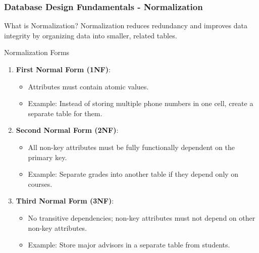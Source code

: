 \documentclass[aspectratio=169]{beamer}
\begin{document}
\begin{frame}[fragile]
    \frametitle{Database Design Fundamentals - Normalization}
    \begin{block}{What is Normalization?}
        Normalization reduces redundancy and improves data integrity by organizing data into smaller, related tables.
    \end{block}
    
    \begin{block}{Normalization Forms}
        \begin{enumerate}
            \item \textbf{First Normal Form (1NF)}:
                \begin{itemize}
                    \item Attributes must contain atomic values.
                    \item Example: Instead of storing multiple phone numbers in one cell, create a separate table for them.
                \end{itemize}
            \item \textbf{Second Normal Form (2NF)}:
                \begin{itemize}
                    \item All non-key attributes must be fully functionally dependent on the primary key.
                    \item Example: Separate grades into another table if they depend only on courses.
                \end{itemize}
            \item \textbf{Third Normal Form (3NF)}:
                \begin{itemize}
                    \item No transitive dependencies; non-key attributes must not depend on other non-key attributes.
                    \item Example: Store major advisors in a separate table from students.
                \end{itemize}
        \end{enumerate}
    \end{block}
\end{frame}
\end{document}
